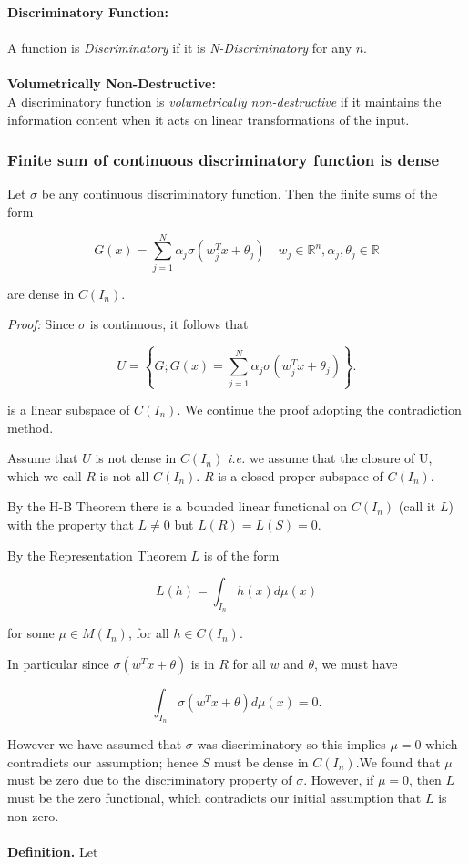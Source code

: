 \textbf{Discriminatory Function:}\\ \\
A function is \textit{Discriminatory} if it is \textit{N-Discriminatory} for any \( n \). \\ \\
\textbf{Volumetrically Non-Destructive:} \\
A discriminatory function is \textit{volumetrically non-destructive} if it maintains the information content when it acts on linear transformations of the input.




\subsubsection{Finite sum of continuous discriminatory function is dense } Let $\sigma$ be any continuous discriminatory function. Then the finite sums of the form

$$
G(x)=\sum_{j=1}^N \alpha_j \sigma\left(w_j^T x+\theta_j\right) \quad w_j \in \mathbb{R}^n, \alpha_j, \theta_j \in \mathbb{R}
$$

are dense in $C\left(I_n\right)$.

\textit{Proof:} Since $\sigma$ is continuous, it follows that

$$
U=\left\{G ; G(x)=\sum_{j=1}^N \alpha_j \sigma\left(w_j^T x+\theta_j\right)\right\} .
$$

is a linear subspace of $C\left(I_n\right)$. We continue the proof adopting the contradiction method.

Assume that $U$ is not dense in $C\left(I_n\right)$ \textit{i.e.} we assume that the closure of U, which we call $R$ is not all $C(I_n)$. $R$ is a closed proper subspace of $C(I_n)$.

By the H-B Theorem there is a bounded linear functional on $C(I_n)$ (call it $L$) with the property that $L\neq 0$ but $L(R)=L(S)=0$.

By the Representation Theorem $L$ is of the form

$$
L(h) = \int_{I_n}h(x)d\mu(x)
$$

for some $\mu\in M(I_n)$, for all $h\in C(I_n)$.

In particular since $\sigma(w^Tx+\theta)$ is in $R$ for all $w$ and $\theta$, we must have

$$
\int_{I_n}\sigma(w^Tx+\theta)d\mu(x)=0.
$$

However we have assumed that $\sigma$ was discriminatory so this implies $\mu=0$ which contradicts our assumption; hence $S$ must be dense in $C(I_n)$.We found that $\mu$ must be zero due to the discriminatory property of $\sigma$.
However, if $\mu = 0$, then $L$ must be the zero functional, which contradicts our initial assumption that $L$ is non-zero.\\ \\
\textbf{Definition.}
Let

